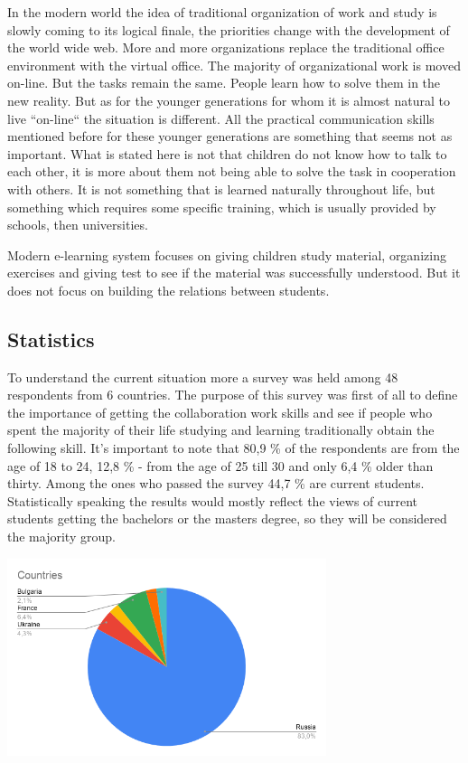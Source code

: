 \documentclass[10pt,oneside,english,a4paper]{article}
\begin{document}
In the modern world the idea of traditional organization of work and study is slowly coming to its logical finale, the priorities change with the development of the world wide web. More and more organizations replace the traditional office environment with the virtual office. The majority of organizational work is moved on-line. But the tasks remain the same. People learn how to solve them in the new reality. But as for the younger generations for whom it is almost natural to live ``on-line`` the situation is different. All the practical communication skills mentioned before for these younger generations are something that seems not as important. What is stated here is not that children do not know how to talk to each other, it is more about them not being able to solve the task in cooperation with others. It is not something that is learned naturally throughout life, but something which requires some specific training, which is usually provided by schools, then universities. \par
Modern e-learning system focuses on giving children study material, organizing exercises and giving test to see if the material was successfully understood. But it does not focus on building the relations between students. 

\subsection{Statistics} \label{stat}
To understand the current situation more a survey was held among 48 respondents from 6 countries. The purpose of this survey was first of all to define the importance of getting the collaboration work skills and see if people who spent the majority of their life studying and learning traditionally obtain the following skill. It's important to note that 80,9 \% of the respondents are from the age of 18 to 24, 12,8 \% - from the age of 25 till 30 and only 6,4 \% older than thirty. Among the ones who passed the survey 44,7 \% are current students. Statistically speaking the results would mostly reflect the views of current students getting the bachelors or the masters degree, so they will be considered the majority group. 

\includegraphics[width=0.7\textwidth]{Countries.png}
\end{document}

